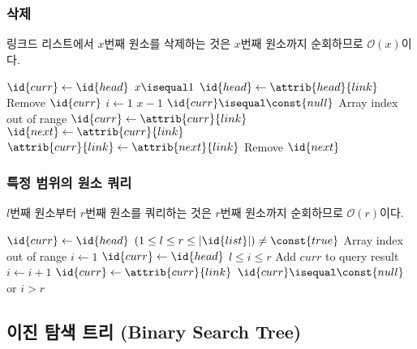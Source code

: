 \subsubsection{삭제} 링크드 리스트에서 $x$번째 원소를 삭제하는 것은 $x$번째 원소까지 순회하므로 $\mathcal{O}\left(x\right)$이다.

\begin{codebox}
\li $\id{curr} \gets \id{head}$
\li \If $x \isequal 1$ \Then
\li     $\id{head} \gets \attrib{head}{link}$
\li     Remove $\id{curr}$
\li \Else
\li     \For $i \gets 1$ \To $x-1$ \Do
\li         \If $\id{curr} \isequal \const{null}$ \Then
\li             \Error Array index out of range
\li         \Else
\li             $\id{curr} \gets \attrib{curr}{link}$
            \End
        \End
\li     $\id{next} \gets \attrib{curr}{link}$
\li     $\attrib{curr}{link} \gets \attrib{next}{link}$
\li     Remove $\id{next}$
    \End
\end{codebox}

\subsubsection{특정 범위의 원소 쿼리} $l$번째 원소부터 $r$번째 원소를 쿼리하는 것은 $r$번째 원소까지 순회하므로 $\mathcal{O}\left(r\right)$이다.

\begin{codebox}

\li $\id{curr} \gets \id{head}$
\li \If $(1 \leq l \leq r \leq |\id{list}|) \neq \const{true}$ \Then
\li     \Error Array index out of range
    \End
\li $i \gets 1$
\li $\id{curr} \gets \id{head}$
\li \Repeat
\li     \If $l \leq i \leq r$ \Then
\li         Add $curr$ to query result
        \End
\li     $i \gets i + 1$
\li     $\id{curr} \gets \attrib{curr}{link}$
\li \Until $\id{curr} \isequal \const{null}$ or $i > r$
\end{codebox}

\newpage

\subsection{이진 탐색 트리 (Binary Search Tree)}

